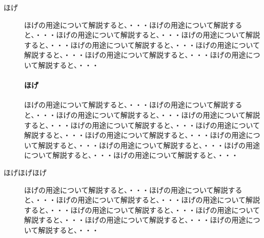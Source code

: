 \documentclass{jsarticle}
\begin{document}
\begin{description}
\item[ほげ] ほげの用途について解説すると、・・・ほげの用途について解説すると、・・・ほげの用途について解説すると、・・・ほげの用途について解説すると、・・・ほげの用途について解説すると、・・・ほげの用途について解説すると、・・・ほげの用途について解説すると、・・・ほげの用途について解説すると、・・・
\paragraph{ほげ} ほげの用途について解説すると、・・・ほげの用途について解説すると、・・・ほげの用途について解説すると、・・・ほげの用途について解説すると、・・・ほげの用途について解説すると、・・・ほげの用途について解説すると、・・・ほげの用途について解説すると、・・・ほげの用途について解説すると、・・・ほげの用途について解説すると、・・・ほげの用途について解説すると、・・・ほげの用途について解説すると、・・・

\item[ほげほげほげ] ほげの用途について解説すると、・・・ほげの用途について解説すると、・・・ほげの用途について解説すると、・・・ほげの用途について解説すると、・・・ほげの用途について解説すると、・・・ほげの用途について解説すると、・・・ほげの用途について解説すると、・・・ほげの用途について解説すると、・・・
\end{description}
\end{document}

